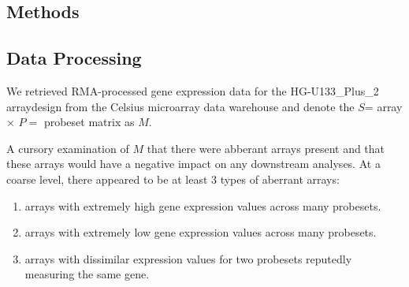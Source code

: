 \documentclass{bioinfo}
\begin{document}
\begin{methods}
\section{Methods}


\subsection{Data Processing}\label{Processing}

We retrieved RMA-processed gene expression data for the HG-U133\_Plus\_2
arraydesign from the Celsius microarray data warehouse \cite{rma,celsius} and
denote the $S$=
array $\times$ $P=$ probeset matrix
as $M$. %


A cursory examination of $M$ that there were abberant arrays present and that
these arrays would have a negative impact on any downstream analyses.  At a
coarse level, there appeared to be at least 3 types of aberrant arrays:

\renewcommand{\labelenumi}{\Alph{enumi}.}
\begin{enumerate}
\item arrays with extremely high gene expression values across many probesets.
\item arrays with extremely low gene expression values across many probesets.
\item arrays with dissimilar expression values for two probesets reputedly
measuring the same gene.
\end{enumerate}


\end{methods}
\end{document}
